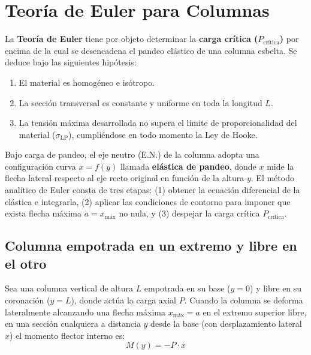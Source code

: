 \section{Teoría de Euler para Columnas}

La \textbf{Teoría de Euler} tiene por objeto determinar la \textbf{carga crítica ($P_{\text{crítica}}$)} por encima de la cual se desencadena el pandeo elástico de una columna esbelta. Se deduce bajo las siguientes hipótesis:
\begin{enumerate}
    \item El material es homogéneo e isótropo.
    \item La sección transversal es constante y uniforme en toda la longitud $L$.
    \item La tensión máxima desarrollada no supera el límite de proporcionalidad del material ($\sigma_{\text{LP}}$), cumpliéndose en todo momento la Ley de Hooke.
\end{enumerate}

Bajo carga de pandeo, el eje neutro (E.N.) de la columna adopta una configuración curva $x = f(y)$ llamada \textbf{elástica de pandeo}, donde $x$ mide la flecha lateral respecto al eje recto original en función de la altura $y$. El método analítico de Euler consta de tres etapas: (1) obtener la ecuación diferencial de la elástica e integrarla, (2) aplicar las condiciones de contorno para imponer que exista flecha máxima $a = x_{\text{máx}}$ no nula, y (3) despejar la carga crítica $P_{\text{crítica}}$.

\subsection{Columna empotrada en un extremo y libre en el otro}

Sea una columna vertical de altura $L$ empotrada en su base ($y = 0$) y libre en su coronación ($y = L$), donde actúa la carga axial $P$. Cuando la columna se deforma lateralmente alcanzando una flecha máxima $x_{\text{máx}} = a$ en el extremo superior libre, en una sección cualquiera a distancia $y$ desde la base (con desplazamiento lateral $x$) el momento flector interno es:
\begin{equation*}
    M(y) = -P \cdot x
\end{equation*}

